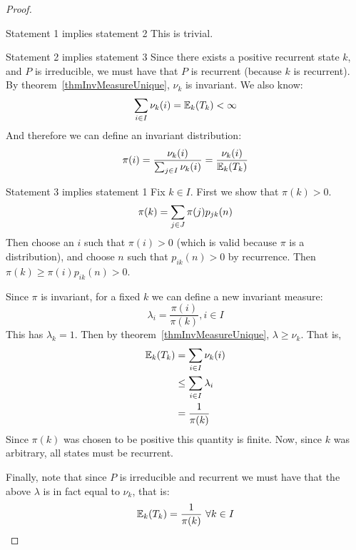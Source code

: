 \documentclass[../Main.tex]{subfiles}
\begin{document}
\begin{proof}
    \begin{subproof}{Statement 1 implies statement 2}
        This is trivial.
    \end{subproof}
    \begin{subproof}{Statement 2 implies statement 3}
        Since there exists a positive recurrent state $k$, and $P$ is irreducible, we must have that $P$ is recurrent (because $k$ is recurrent). By theorem~\ref{thmInvMeasureUnique}, $\nu_k$ is invariant. We also know:
        \begin{equation*}
            \sum_{i \in I} \nu_k(i) = \mathbb{E}_k(T_k) < \infty
        \end{equation*}
        And therefore we can define an invariant distribution:
        \begin{equation*}
            \pi(i) = \frac{\nu_k(i)}{\sum_{j \in I} \nu_k(i)} = \frac{\nu_k(i)}{\mathbb{E}_k(T_k)}
        \end{equation*}
    \end{subproof}
    \begin{subproof}{Statement 3 implies statement 1}
        Fix $k \in I$. First we show that $\pi(k) > 0$.
        \begin{equation*}
            \pi(k) = \sum_{j \in J} \pi(j) p_{jk}(n) \\
        \end{equation*}
        Then choose an $i$ such that $\pi(i) > 0$ (which is valid because $\pi$ is a distribution), and choose $n$ such that $p_{ik}(n) > 0$ by recurrence. Then $\pi(k) \geq \pi(i) p_{ik}(n) > 0$.

        Since $\pi$ is invariant, for a fixed $k$ we can define a new invariant measure:
        \begin{equation*}
            \lambda_i = \frac{\pi(i)}{\pi(k)}, i \in I
        \end{equation*}
        This has $\lambda_k = 1$. Then by theorem~\ref{thmInvMeasureUnique}, $\lambda \geq \nu_k$. That is,
        \begin{align*}
            \mathbb{E}_k(T_k) &= \sum_{i\in I} \nu_k(i) \\
            &\leq \sum_{i \in I} \lambda_i \\
            &= \frac{1}{\pi(k)}
        \end{align*}
        Since $\pi(k)$ was chosen to be positive this quantity is finite. Now, since $k$ was arbitrary, all states must be recurrent.
    \end{subproof}
    Finally, note that since $P$ is irreducible and recurrent we must have that the above $\lambda$ is in fact equal to $\nu_k$, that is:
    \begin{equation*}
        \mathbb{E}_k(T_k) = \frac{1}{\pi(k)}~\forall k \in I
    \end{equation*}
\end{proof}
\end{document}
